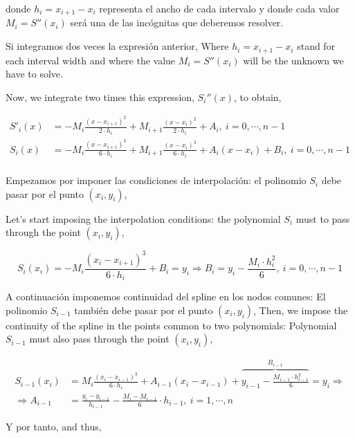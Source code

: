 \begin{paracol}{2}
donde $h_i=x_{i+1}-x_i$ representa el ancho de cada intervalo y donde cada valor $M_i=S''(x_i)$ será una de las incógnitas que deberemos resolver.

Si integramos dos veces la expresión anterior,
\switchcolumn
Where  $h_i=x_{i+1}-x_i$ stand for each interval width and where the value $M_i=S''(x_i)$ will be the unknown we have to solve. 

Now, we integrate two times this expression, $S_i''(x)$, to obtain,
\end{paracol}
\begin{align*}
S'_i(x)&=-M_i\frac{(x-x_{i+1})^2}{2\cdot h_i}+M_{i+1}\frac{(x-x_i)^2}{2\cdot h_i}+A_i,\   i=0,\cdots, n-1\\
S_i(x)&=-M_i\frac{(x-x_{i+1})^3}{6\cdot h_i}+M_{i+1}\frac{(x-x_i)^3}{6\cdot h_i}+A_i(x-x_i)+B_i,\   i=0,\cdots, n-1\\
\end{align*}
\begin{paracol}{2}
Empezamos por imponer las condiciones de interpolación: el polinomio $S_i$ debe pasar por el punto $(x_i,y_i)$,

\switchcolumn
Let's start imposing the interpolation conditions: the polynomial $S_i$ must to pass through the point $(x_i,y_i)$,
\end{paracol}
\begin{equation*}
S_i(x_i)=-M_i\frac{(x_i-x_{i+1})^3}{6\cdot h_i}+B_i=y_i \Rightarrow B_i=y_i-\frac{M_i\cdot h_i^2}{6},\ i=0,\cdots, n-1
\end{equation*}
\begin{paracol}{2}
A continuación imponemos continuidad del spline en los nodos comunes: El polinomio $S_{i-1}$ también debe pasar por el punto $(x_i, y_i)$,
\switchcolumn
Then, we impose the continuity of the spline in the points common to two polynomials: Polynomial $S_{i-1}$ must also pass through the point $(x_i, y_i)$, 
\end{paracol}
\begin{align*}
S_{i-1}(x_i)&=M_i\frac{(x_i-x_{i-1})^3}{6\cdot h_i}+A_{i-1}(x_i-x_{i-1})+\overbrace{y_{i-1}-\frac{M_{i-1}\cdot h_{i-1}^2}{6}}^{B_{i-1}}=y_i \Rightarrow\\
\Rightarrow A_{i-1}&=\frac{y_i-y_{i-1}}{h_{i-1}}-\frac{M_i-M_{i-1}}{6}\cdot h_{i-1}, \ i=1,\cdots, n
\end{align*}
\begin{paracol}{2}
Y por tanto,
\switchcolumn
and thus,
\end{paracol}
